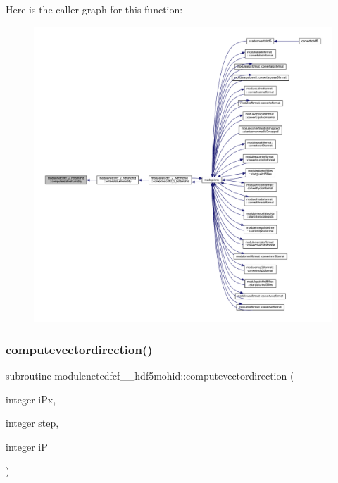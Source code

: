 Here is the caller graph for this function\+:\nopagebreak
\begin{figure}[H]
\begin{center}
\leavevmode
\includegraphics[width=350pt]{namespacemodulenetcdfcf__2__hdf5mohid_a7f79a0cd0ca5a26cabb89d21e7a2daf4_icgraph}
\end{center}
\end{figure}
\mbox{\label{namespacemodulenetcdfcf__2__hdf5mohid_a035fed19e9c4075ee7babb392fe071e6}} 
\subsubsection{\texorpdfstring{computevectordirection()}{computevectordirection()}}
{\footnotesize\ttfamily subroutine modulenetcdfcf\+\_\+\_\+hdf5mohid\+::computevectordirection (\begin{DoxyParamCaption}\item[{integer}]{i\+Px,  }\item[{integer}]{step,  }\item[{integer}]{iP }\end{DoxyParamCaption})\hspace{0.3cm}{\ttfamily [private]}}

